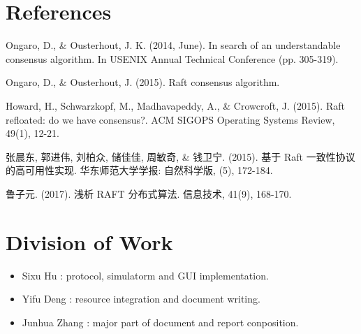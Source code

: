 \documentclass{report}
\begin{document}
\appendix
\chapter{References}
\noindent [1] Ongaro, D., \& Ousterhout, J. K. (2014, June). In search of an understandable consensus algorithm. In USENIX Annual Technical Conference (pp. 305-319).\par
\noindent [2] Ongaro, D., \& Ousterhout, J. (2015). Raft consensus algorithm.\par
\noindent [3] Howard, H., Schwarzkopf, M., Madhavapeddy, A., \& Crowcroft, J. (2015). Raft refloated: do we have consensus?. ACM SIGOPS Operating Systems Review, 49(1), 12-21.\par
\noindent [4] 张晨东, 郭进伟, 刘柏众, 储佳佳, 周敏奇, \& 钱卫宁. (2015). 基于 Raft 一致性协议的高可用性实现. 华东师范大学学报: 自然科学版, (5), 172-184.\par
\noindent [5] 鲁子元. (2017). 浅析 RAFT 分布式算法. 信息技术, 41(9), 168-170.\par
\chapter{Division of Work}
\begin{itemize}
	\item Sixu Hu : protocol, simulatorm and GUI implementation.
	\item Yifu Deng : resource integration and document writing.
	\item Junhua Zhang : major part of document and report conposition.
\end{itemize}

\vfill
\end{document}
